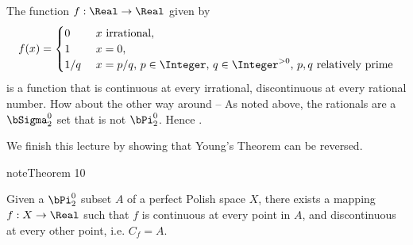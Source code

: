 \documentclass[letterpaper,10pt,english]{jupyterBook}
\begin{document}
\sphinxAtStartPar
The function \(f: \Real \to \Real\) given by
\begin{equation*}
	f(x) = \begin{cases}
		0 & \text{ $x$ irrational}, \\
		1 & \text{ $x = 0$}, \\
		1/q & \text{ $x = p/q$, $p\in \Integer$, $q \in \Integer^{>0} $, $p,q$ relatively prime} 
	\end{cases}
\end{equation*}
\sphinxAtStartPar
is a function that is continuous at every irrational, discontinuous at every rational number. How about the other way around –  As noted above, the rationals are a \(\bSigma^0_2\) set that is not \(\bPi^0_2\). Hence .

\sphinxAtStartPar
We finish this lecture by showing that Young’s Theorem can be reversed.
\label{Borel:theorem-7}
\begin{sphinxadmonition}{note}{Theorem 10}



\sphinxAtStartPar
Given a \(\bPi^0_2\) subset \(A\) of a perfect Polish space \(X\), there exists a mapping \(f: X \to \Real\) such that \(f\) is continuous at every point in \(A\), and discontinuous at every other point, i.e. \(C_f = A\).
\end{sphinxadmonition}
\end{document}
